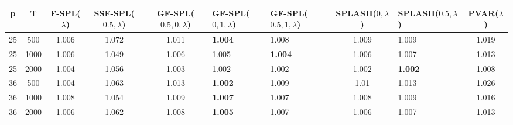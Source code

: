 \begin{tabular}{cccccllclc}
\hline
  p  &  T   &  F-SPL($\lambda$)  &  SSF-SPL($0.5, \lambda$)  &  GF-SPL($0.5, 0, \lambda$)  & GF-SPL($0, 1, \lambda$)   & GF-SPL($0.5, 1, \lambda$)   &  SPLASH($0, \lambda$)  & SPLASH($0.5, \lambda$)   &  PVAR($\lambda$)  \\
\hline
 25  & 500  &       1.006        &           1.072           &            1.011            & \textbf{1.004}            & 1.008                       &         1.009          & 1.009                    &       1.019       \\
 25  & 1000 &       1.006        &           1.049           &            1.006            & 1.005                     & \textbf{1.004}              &         1.006          & 1.007                    &       1.013       \\
 25  & 2000 &       1.004        &           1.056           &            1.003            & 1.002                     & 1.002                       &         1.002          & \textbf{1.002}           &       1.008       \\
 36  & 500  &       1.004        &           1.063           &            1.013            & \textbf{1.002}            & 1.009                       &          1.01          & 1.013                    &       1.026       \\
 36  & 1000 &       1.008        &           1.054           &            1.009            & \textbf{1.007}            & 1.007                       &         1.008          & 1.009                    &       1.016       \\
 36  & 2000 &       1.006        &           1.062           &            1.008            & \textbf{1.005}            & 1.007                       &         1.006          & 1.007                    &       1.013       \\
\hline
\end{tabular}